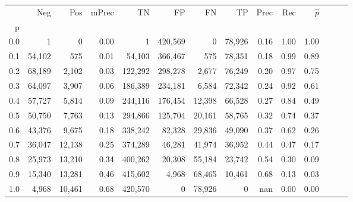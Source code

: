 \begin{tabular}{rrrrrrrrrrrrrr}
\toprule
{} &     Neg &     Pos & mPrec &       TN &       FP &      FN &      TP &  Prec &   Rec & $\hat{p}$ \\
p   &         &         &       &          &          &         &         &       &       &           \\
\midrule
0.0 &       1 &       0 &  0.00 &        1 &  420,569 &       0 &  78,926 &  0.16 &  1.00 &      1.00 \\
0.1 &  54,102 &     575 &  0.01 &   54,103 &  366,467 &     575 &  78,351 &  0.18 &  0.99 &      0.89 \\
0.2 &  68,189 &   2,102 &  0.03 &  122,292 &  298,278 &   2,677 &  76,249 &  0.20 &  0.97 &      0.75 \\
0.3 &  64,097 &   3,907 &  0.06 &  186,389 &  234,181 &   6,584 &  72,342 &  0.24 &  0.92 &      0.61 \\
0.4 &  57,727 &   5,814 &  0.09 &  244,116 &  176,454 &  12,398 &  66,528 &  0.27 &  0.84 &      0.49 \\
0.5 &  50,750 &   7,763 &  0.13 &  294,866 &  125,704 &  20,161 &  58,765 &  0.32 &  0.74 &      0.37 \\
0.6 &  43,376 &   9,675 &  0.18 &  338,242 &   82,328 &  29,836 &  49,090 &  0.37 &  0.62 &      0.26 \\
0.7 &  36,047 &  12,138 &  0.25 &  374,289 &   46,281 &  41,974 &  36,952 &  0.44 &  0.47 &      0.17 \\
0.8 &  25,973 &  13,210 &  0.34 &  400,262 &   20,308 &  55,184 &  23,742 &  0.54 &  0.30 &      0.09 \\
0.9 &  15,340 &  13,281 &  0.46 &  415,602 &    4,968 &  68,465 &  10,461 &  0.68 &  0.13 &      0.03 \\
1.0 &   4,968 &  10,461 &  0.68 &  420,570 &        0 &  78,926 &       0 &   nan &  0.00 &      0.00 \\
\bottomrule
\end{tabular}
